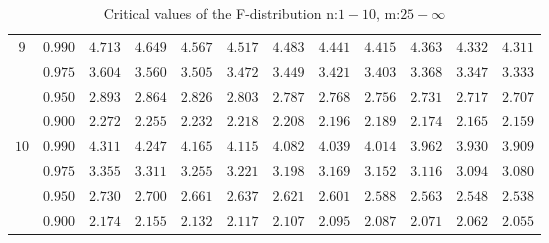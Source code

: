 \documentclass[11pt]{article}
\theoremstyle{definition}
\begin{document}
\begin{table}[H]
\begin{tabularx}{\linewidth}{c | c | c c c c c c c c c c}
		$9$ & $0.990$ & $4.713$ & $4.649$ & $4.567$ & $4.517$ & $4.483$ & $4.441$ & $4.415$ & $4.363$ & $4.332$ & $4.311$ \\
		& $0.975$ & $3.604$ & $3.560$ & $3.505$ & $3.472$ & $3.449$ & $3.421$ & $3.403$ & $3.368$ & $3.347$ & $3.333$ \\
		& $0.950$ & $2.893$ & $2.864$ & $2.826$ & $2.803$ & $2.787$ & $2.768$ & $2.756$ & $2.731$ & $2.717$ & $2.707$ \\
		& $0.900$ & $2.272$ & $2.255$ & $2.232$ & $2.218$ & $2.208$ & $2.196$ & $2.189$ & $2.174$ & $2.165$ & $2.159$ \\
		$10$ & $0.990$ & $4.311$ & $4.247$ & $4.165$ & $4.115$ & $4.082$ & $4.039$ & $4.014$ & $3.962$ & $3.930$ & $3.909$ \\
		& $0.975$ & $3.355$ & $3.311$ & $3.255$ & $3.221$ & $3.198$ & $3.169$ & $3.152$ & $3.116$ & $3.094$ & $3.080$ \\
		& $0.950$ & $2.730$ & $2.700$ & $2.661$ & $2.637$ & $2.621$ & $2.601$ & $2.588$ & $2.563$ & $2.548$ & $2.538$ \\
		& $0.900$ & $2.174$ & $2.155$ & $2.132$ & $2.117$ & $2.107$ & $2.095$ & $2.087$ & $2.071$ & $2.062$ & $2.055$
	\end{tabularx}
	\caption{Critical values of the F-distribution n:$1-10$, m:$25-\infty$}
\end{table}
\end{document}
